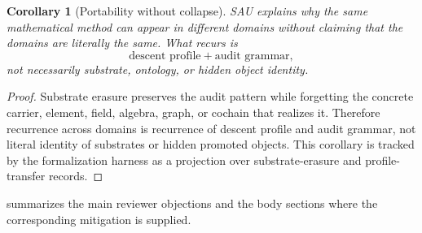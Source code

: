 \documentclass[11pt]{article}
\newtheorem{corollary}[theorem]{Corollary}
\theoremstyle{definition}
\begin{document}
\begin{corollary}[Portability without collapse]
\label{cor:sau-portability-without-collapse}
SAU explains why the same mathematical method can appear in different domains without claiming that the domains are literally the same.  What recurs is
\[
\text{descent profile}+\text{audit grammar},
\]
not necessarily substrate, ontology, or hidden object identity.
\end{corollary}

\begin{proof}
Substrate erasure preserves the audit pattern while forgetting the concrete
carrier, element, field, algebra, graph, or cochain that realizes it.  Therefore
recurrence across domains is recurrence of descent profile and audit grammar,
not literal identity of substrates or hidden promoted objects.  This corollary is
tracked by the formalization harness as a projection over substrate-erasure and
profile-transfer records.
\end{proof}

 summarizes the main reviewer objections and the
body sections where the corresponding mitigation is supplied.
\end{document}
